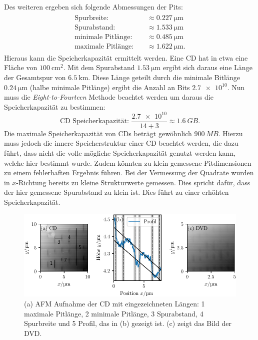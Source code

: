 Des weiteren ergeben sich folgende Abmessungen der Pits:
\begin{align}
  \begin{aligned}
    \text{Spurbreite: } &  &\approx  \SI{0.227}{\micro\meter}\\
    \text{Spurabstand: } &        &\approx \SI{1.533}{\micro\meter} \\
    \text{minimale Pitlänge: } &     &\approx \SI{0.485}{\micro\meter} \\
    \text{maximale Pitlänge: } &    &\approx \SI{1.622}{\micro\meter}.
  \end{aligned}
\end{align}
Hieraus kann die Speicherkapazität ermittelt werden. Eine CD hat in etwa eine Fläche von $\SI{100}{\centi\meter\squared}$. Mit dem Spurabstand
$\SI{1.53}{\micro\meter}$ ergibt sich daraus
eine Länge der Gesamtspur von $\SI{6.5}{\kilo\meter}$. Diese Länge geteilt durch die minimale Bitlänge $\SI{0.24}{\micro\meter}$
(halbe minimale Pitlänge) ergibt die Anzahl an Bits $\num{2.7e10}$.
Nun muss die \textit{Eight-to-Fourteen}
Methode beachtet werden um daraus die Speicherkapazität zu bestimmen:
\begin{equation}
  \text{CD Speicherkapazität: } \frac{\num{2.7e10}}{14 + 3} \approx \SI{1.6}{GB}.
\end{equation}
Die maximale Speicherkapazität von CDs beträgt gewöhnlich $\SI{900}{MB}$. Hierzu muss jedoch die innere Speicherstruktur einer CD beachtet werden, die dazu führt,
dass nicht die volle mögliche Speicherkapazität genutzt werden kann, welche hier bestimmt wurde. Zudem könnten zu klein gemessene Pitdimensionen
zu einem fehlerhaften Ergebnis führen. Bei der Vermessung der Quadrate wurden in $x$-Richtung bereits zu kleine Strukturwerte gemessen. Dies spricht dafür,
dass der hier gemessene Spurabstand zu klein ist. Dies führt zu einer erhöhten Speicherkapazität.

\begin{figure}
  \centering
  \includegraphics[scale = 1]{../analysis/data/cd/cd_profil.pdf}
  \caption{(a) AFM Aufnahme der CD mit eingezeichneten Längen: 1 maximale Pitlänge, 2 minimale Pitlänge,
  3 Spurabstand, 4 Spurbreite und 5 Profil, das in (b) gezeigt ist. (c) zeigt das Bild der DVD.}
  \label{fig: cd}
\end{figure}

